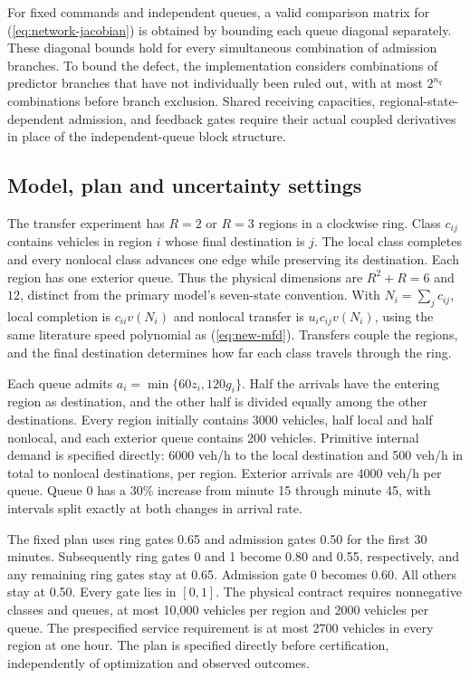 \documentclass[preprint,12pt]{elsarticle}
\begin{document}
For fixed commands and independent queues, a valid comparison matrix for
(\ref{eq:network-jacobian}) is obtained by bounding each queue diagonal
separately. These diagonal bounds hold for every simultaneous combination
of admission branches. To bound the defect, the implementation considers
combinations of predictor branches that have not individually been ruled
out, with at most $2^{n_q}$ combinations before branch exclusion. Shared receiving capacities,
regional-state-dependent admission, and feedback gates require their actual
coupled derivatives in place of the independent-queue block structure.

\subsection{Model, plan and uncertainty settings}

The transfer experiment has $R=2$ or $R=3$ regions in a clockwise ring. Class
$c_{ij}$ contains vehicles in region $i$ whose final destination is $j$.
The local class completes and every nonlocal class advances one edge while
preserving its destination. Each region has one exterior queue. Thus the
physical dimensions are $R^2+R=6$ and $12$, distinct from the primary model's
seven-state convention. With $N_i=\sum_jc_{ij}$, local completion is
$c_{ii}v(N_i)$ and nonlocal transfer is $u_i c_{ij}v(N_i)$, using the same
literature speed polynomial as (\ref{eq:new-mfd}). Transfers couple the
regions, and the final destination determines how
far each class travels through the ring.

Each queue admits $a_i=\min\{60z_i,120g_i\}$. Half the arrivals have the
entering region as destination, and the other half is divided equally among the
other destinations. Every region initially contains 3000 vehicles, half
local and half nonlocal, and each exterior queue contains 200 vehicles.
Primitive internal demand is specified directly: 6000 veh/h to the local
destination and 500 veh/h in total to nonlocal destinations, per region.
Exterior arrivals are 4000 veh/h per queue. Queue 0 has a 30\% increase
from minute 15 through minute 45, with intervals split exactly at both changes in arrival rate.

The fixed plan uses ring gates 0.65 and admission gates 0.50 for the first
30 minutes. Subsequently ring gates 0 and 1 become 0.80 and 0.55, respectively,
and any remaining ring gates stay at 0.65. Admission gate 0 becomes 0.60.
All others stay at 0.50. Every gate lies in $[0,1]$. The physical contract
requires nonnegative classes and queues, at most 10,000 vehicles per region
and 2000 vehicles per queue. The prespecified service requirement is at most
2700 vehicles in every region at one hour. The plan is specified directly
before certification, independently of optimization and observed outcomes.
\end{document}
